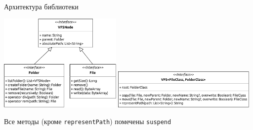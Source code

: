 \documentclass[14pt,aspectratio=169,hyperref={pdftex,unicode},xcolor=dvipsnames]{beamer}
\begin{document}
\begin{frame}{Архитектура библиотеки}
\begin{center}
\includegraphics[width=6cm,keepaspectratio]{vfsnode-folder-file}
\hspace{0.2cm}
\includegraphics[width=7cm,keepaspectratio]{vfs}

\scriptsize Все методы (кроме \texttt{representPath}) помечены \texttt{suspend}
\end{center}
\end{frame}

\end{document}
